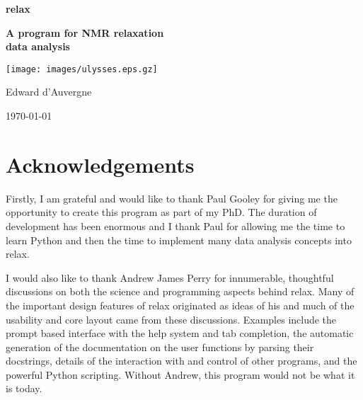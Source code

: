 \documentclass[a4paper, 11pt, twoside, openright]{book}
\begin{document}
\frontmatter



\begin{titlepage}
\begin{center}


{\Huge \textbf{relax}}

{\huge \textbf{A program for NMR relaxation\\data analysis}}

\centerline{\texttt{[image: images/ulysses.eps.gz]}}

{\Large Edward d'Auvergne}

{\large \today}

\end{center}
\end{titlepage}



\chapter*{Acknowledgements}

Firstly, I am grateful and would like to thank Paul Gooley for giving me the opportunity to create this program as part of my PhD.  The duration of development has been enormous and I thank Paul for allowing me the time to learn Python and then the time to implement many data analysis concepts into relax.

I would also like to thank Andrew James Perry for innumerable, thoughtful discussions on both the science and programming aspects behind relax.  Many of the important design features of relax originated as ideas of his and much of the usability and core layout came from these discussions.  Examples include the prompt based interface with the help system and tab completion, the automatic generation of the documentation on the user functions by parsing their docstrings, details of the interaction with and control of other programs, and the powerful Python scripting.  Without Andrew, this program would not be what it is today.
\end{document}
